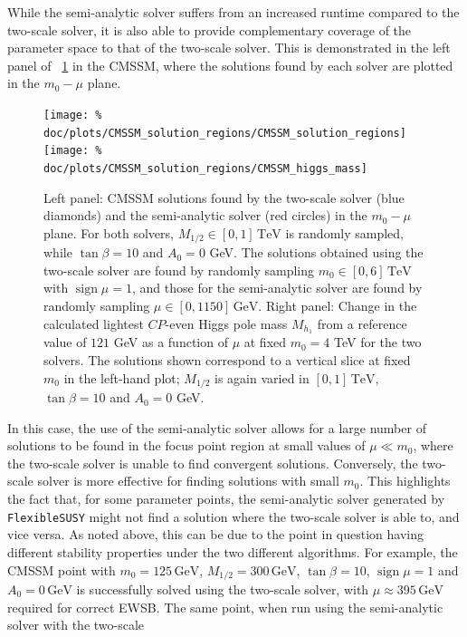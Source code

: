 \documentclass[final,3p,11pt,pdflatex]{elsarticle}
\makeatletter
\newcommand{\fs}{\texttt{FlexibleSUSY}\@\xspace}
\newcommand{\unit}[1]{\,\text{#1}}      %
\newcommand{\figref}[1]{\figurename~\ref{#1}}
\newcommand{\CP}{\ensuremath{CP}\xspace}
\newcommand{\azero}{\ensuremath{A_0}\xspace}
\newcommand{\mhalf}{\ensuremath{M_{1/2}}\xspace}
\newcommand{\mzero}{\ensuremath{m_0}\xspace}
\DeclareMathOperator{\sign}{sign}
\makeatother
\begin{document}
While the semi-analytic solver suffers from an increased runtime compared to
the two-scale solver, it is also able to provide complementary coverage of the
parameter space to that of the two-scale solver.  This is demonstrated in the
left panel of \figref{fig:cmssm_solution_regions} in the CMSSM, where the
solutions found by each solver are plotted in the $\mzero - \mu$ plane.
%
\begin{figure}
  \centering
  \texttt{[image: \%
    doc/plots/CMSSM\_solution\_regions/CMSSM\_solution\_regions]}
  \texttt{[image: \%
    doc/plots/CMSSM\_solution\_regions/CMSSM\_higgs\_mass]}
  \caption{Left panel: CMSSM solutions found by the two-scale solver
    (blue diamonds) and the semi-analytic solver (red circles) in the
    $\mzero - \mu$ plane.  For both solvers, $\mhalf \in [0,1]\unit{TeV}$
    is randomly sampled, while $\tan\beta = 10$ and $\azero = 0$ GeV\@.
    The solutions obtained using the two-scale solver are found by
    randomly sampling $\mzero \in [0, 6]\unit{TeV}$ with $\sign \mu = 1$,
    and those for the semi-analytic solver are found by randomly sampling
    $\mu \in [0,1150] \unit{GeV}$.  Right panel: Change in the calculated
    lightest \CP-even Higgs pole mass $M_{h_1}$ from a reference value of
    $121$ GeV as a function of $\mu$ at fixed $\mzero = 4$ TeV for the two
    solvers.  The solutions shown correspond to a vertical slice at fixed
    $\mzero$ in the left-hand plot; $\mhalf$ is again varied in
    $[0,1]\unit{TeV}$, $\tan\beta = 10$ and $\azero = 0$ GeV.}
  \label{fig:cmssm_solution_regions}
\end{figure}
%
In this case, the use of the semi-analytic solver allows for a large number
of solutions to be found in the focus point region \cite{Chan:1997bi,
  Feng:1999hg,Feng:1999mn} at small values of $\mu \ll \mzero$, where the
two-scale solver is unable to find convergent solutions.  Conversely,
the two-scale solver is more effective for finding solutions with small
$\mzero$.  This highlights the fact that, for some parameter points,
the semi-analytic solver generated by \fs might not find a solution
where the two-scale solver is able to, and vice versa.  As noted above, this
can be due to the point in question having different stability properties
under the two different algorithms.  For example, the CMSSM point with
$m_0 = 125\unit{GeV}$, $M_{1/2} = 300\unit{GeV}$, $\tan\beta = 10$,
$\sign \mu = 1$ and $A_0 = 0\unit{GeV}$  is successfully solved using the
two-scale solver, with $\mu \approx 395\unit{GeV}$ required for correct EWSB.
The same point, when run using the semi-analytic solver with the two-scale
\end{document}
